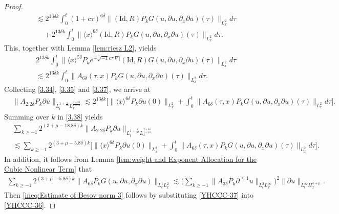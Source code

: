 \documentclass[11pt,twoside]{article}
\def\f{\frac}
\def\p{\partial}
\def\ls{\lesssim}
\newcommand{\w}[1]{\langle {#1} \rangle}
\theoremstyle{plain}
\theoremstyle{definition}
\numberwithin{equation}{section}
\begin{document}
\begin{proof}
\begin{equation*}
\begin{split}
	&\ls
	2^{ 13\delta k}
	\int_{0}^{t}(1+c\tau)^{6\delta}\big\|(\mathrm{Id},R) P_kG(u,\partial u,\p_x\p u)(\tau)\big\|_{L^2_x}d\tau\\
	&\quad+
	2^{ 13\delta k}
	\int_{0}^{t}\big\|\w{x}^{6\delta}(\mathrm{Id},R)P_k G(u,\partial u,\p_x\p u)(\tau)\big\|_{L^2_x}d\tau.
	\end{split}
	\end{equation*}
	This, together with Lemma \ref{lem:riesz L2}, yields
	\begin{equation}\label{3.37}
	\begin{split}
	&2^{ 13\delta k}
	\int_{0}^{t}\big\|\w{x}^{5\delta}P_ke^{\mp \sqrt{-1}c\tau|\nabla|} (\mathrm{Id},R) G(u,\partial u,\p_x\p u)(\tau)\big\|_{L^2_x}d\tau\\
	&\ls
	2^{ 13\delta k}
	\int_{0}^{t}\big\|A_{6\delta}(\tau,x)P_k G(u,\partial u,\p_x\p u)(\tau)\big\|_{L^2_x}d\tau.
	\end{split}
	\end{equation}
	Collecting \eqref{3.34}, \eqref{3.35} and \eqref{3.37}, we arrive at
	\begin{equation}\label{3.38}
		\begin{split}
		&\|A_{2.2\delta}P_k\p u\|_{L_t^{1+\f{1}{4\delta}}L^{\f{2+8\delta}{1-4\delta}}_x}
		\ls
		2^{ 13\delta k}
		\big[	\|\w{x}^{6\delta}P_k\partial u(0)\|_{L^2_x}	+
		\int_{0}^{t}\big\|A_{6\delta}(\tau,x)P_k G(u,\partial u,\p_x\p u)(\tau)\big\|_{L^2_x}d\tau\big].
		\end{split}
		\end{equation}
	Summing over $k$ in \eqref{3.38} yields
	\begin{equation}\label{YHCCC-36}
	\begin{split}
		&\sum_{k\ge -1}2^{(3+\mu-18.8\delta) k}\|A_{2.2\delta}P_k\p u\|_{L_t^{1+\f{1}{4\delta}}L^{\f{2+8\delta}{1-4\delta}}_x}\\
		&\ls
		\sum_{k\ge -1}2^{(3+\mu -5.8\delta) k}\big[
		\|\w{x}^{6\delta}P_k\partial u(0)\|_{L^2_x}
		+
		\int_{0}^{t}\big\|A_{6\delta}(\tau,x)P_k G(u,\partial u,\p_x\p u)(\tau)\big\|_{L^2_x}d\tau\big].
	\end{split}	
	\end{equation}
	In addition, it follows from Lemma \ref{lem:weight and Exponent Allocation for the Cubic Nonlinear Term} that
	\begin{equation}\label{YHCCC-37}
	\begin{split}
	\sum_{k\ge -1}2^{(3+\mu -5.8\delta) k}
	\|A_{6\delta}P_k G(u,\partial u,\p_x\p u)\|_{L^1_tL^2_x}
	\ls
	\big(\sum_{k\ge -1}\|A_{3\delta}P_{k}\p^{\le 1} u\|_{L^2_tL^\infty_x}\big)^2
	\|\p u\|_{L^\infty_tH^{4+\mu}_x}.
	\end{split}
	\end{equation}
	Then \eqref{ineq:Estimate of Besov norm 3} follows by substituting \eqref{YHCCC-37} into \eqref{YHCCC-36}.
\end{proof}
\end{document}
